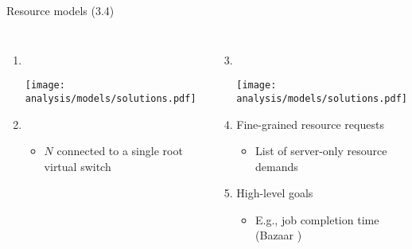 \begin{frame}{Resource models (3.4)}
    \begin{columns}[T,onlytextwidth]
        \begin{enumerate}
            \item {}\\
            \begin{center}
                \texttt{[image: analysis/models/solutions.pdf]}
            \end{center}
            \item {}
            \begin{itemize}
                \item $N$  connected to a single root virtual switch
            \end{itemize}
        \end{enumerate}
        \begin{enumerate}
            \setcounter{enumi}{2}
            \item {}\\
            \begin{center}
                \texttt{[image: analysis/models/solutions.pdf]}
            \end{center}
            \item Fine-grained resource requests
            \begin{itemize}
                \item List of server-only resource demands
            \end{itemize}
            \item High-level goals
            \begin{itemize}
                \item E.g., job completion time (Bazaar \cite{bazaar})
            \end{itemize}
        \end{enumerate}
    \end{columns}
\end{frame}

